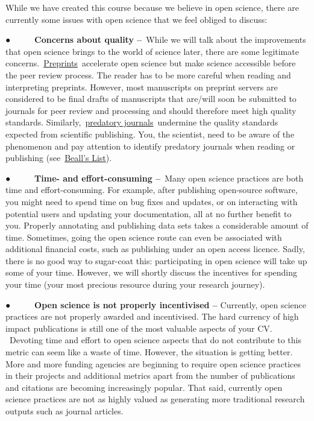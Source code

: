 \documentclass[
]{book}
\begin{document}
While we have created this course because we believe in open science, there are currently some issues with open science that we feel obliged to discuss:

● ~ ~ ~ \textbf{Concerns about quality --}~While we will talk about the improvements that open science brings to the world of science later, there are some legitimate concerns.~\href{https://en.wikipedia.org/wiki/Preprint}{}\href{https://en.wikipedia.org/wiki/Preprint}{Preprints}~accelerate open science but make science accessible before the peer review process. The reader has to be more careful when reading and interpreting preprints. However, most manuscripts on preprint servers are considered to be final drafts of manuscripts that are/will soon be submitted to journals for peer review and processing and should therefore meet high quality standards. Similarly,~\href{https://en.wikipedia.org/wiki/Predatory_publishing}{}\href{https://en.wikipedia.org/wiki/Predatory_publishing}{predatory journals}~undermine the quality standards expected from scientific publishing. You, the scientist, need to be aware of the phenomenon and pay attention to identify predatory journals when reading or publishing (see~\href{https://beallslist.net/}{}\href{https://beallslist.net/}{Beall's List}).

● ~ ~ ~ \textbf{Time- and effort-consuming --}~Many open science practices are both time and effort-consuming. For example, after publishing open-source software, you might need to spend time on bug fixes and updates, or on interacting with potential users and updating your documentation, all at no further benefit to you. Properly annotating and publishing data sets takes a considerable amount of time. Sometimes, going the open science route can even be associated with additional financial costs, such as publishing under an open access licence. Sadly, there is no good way to sugar-coat this: participating in open science will take up some of your time. However, we will shortly discuss the incentives for spending your time (your most precious resource during your research journey).

● ~ ~ ~ \textbf{Open science is not properly incentivised --} Currently, open science practices are not properly awarded and incentivised. The hard currency of high impact publications is still one of the most valuable aspects of your CV. ~Devoting time and effort to open science aspects that do not contribute to this metric can seem like a waste of time. However, the situation is getting better. More and more funding agencies are beginning to require open science practices in their projects and additional metrics apart from the number of publications and citations are becoming increasingly popular. That said, currently open science practices are not as highly valued as generating more traditional research outputs such as journal articles.
\end{document}
